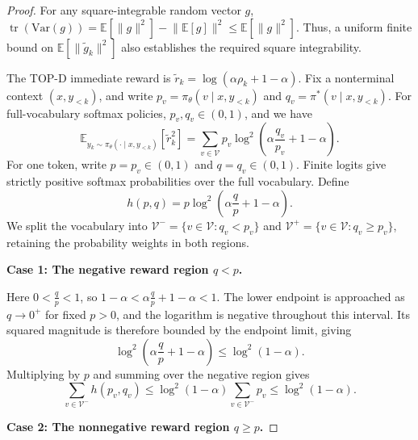 \documentclass{article}
\theoremstyle{plain}
\theoremstyle{definition}
\theoremstyle{remark}
\begin{document}
\begin{proof}
	For any square-integrable random vector $g$, $\operatorname{tr}(\mathrm{Var}(g))=\mathbb{E}[\lVert g\rVert^2]-\lVert\mathbb{E}[g]\rVert^2\leq\mathbb{E}[\lVert g\rVert^2]$. Thus, a uniform finite bound on $\mathbb{E}[\lVert\tilde{g}_k\rVert^2]$ also establishes the required square integrability.
	
	The TOP-D immediate reward is $\tilde{r}_k=\log(\alpha\rho_k+1-\alpha)$. Fix a nonterminal context $(x,y_{<k})$, and write $p_v=\pi_\theta(v\mid x,y_{<k})$ and $q_v=\pi^*(v\mid x,y_{<k})$. For full-vocabulary softmax policies, $p_v,q_v\in(0,1)$, and we have
	\begin{equation}
		\mathbb{E}_{y_k \sim \pi_\theta(\cdot \mid x, y_{<k})}\left[\tilde{r}_k^2\right] = \sum_{v\in\mathcal{V}}p_v\log^2\left(\alpha\frac{q_v}{p_v}+1-\alpha\right).
	\end{equation}
	For one token, write $p=p_v\in(0,1)$ and $q=q_v\in(0,1)$. Finite logits give strictly positive softmax probabilities over the full vocabulary. Define
	\begin{equation}
		h(p, q) = p \log^2\left(\alpha \frac{q}{p} + 1 - \alpha\right).
	\end{equation}
	We split the vocabulary into $\mathcal{V}^-=\{v\in\mathcal{V}:q_v<p_v\}$ and $\mathcal{V}^+=\{v\in\mathcal{V}:q_v\geq p_v\}$, retaining the probability weights in both regions.
	
	\textbf{Case 1: The negative reward region $q < p$.}
	
	Here $0<\frac{q}{p}<1$, so $1-\alpha<\alpha\frac{q}{p}+1-\alpha<1$. The lower endpoint is approached as $q\to0^+$ for fixed $p>0$, and the logarithm is negative throughout this interval. Its squared magnitude is therefore bounded by the endpoint limit, giving
	\begin{equation}
		\log^2\left(\alpha \frac{q}{p} + 1 - \alpha\right) \leq \log^2(1 - \alpha).
	\end{equation}
	Multiplying by $p$ and summing over the negative region gives
	\begin{equation}
		\sum_{v\in\mathcal{V}^-}h(p_v,q_v)\leq\log^2(1-\alpha)\sum_{v\in\mathcal{V}^-}p_v\leq\log^2(1-\alpha).
	\end{equation}
	
	\textbf{Case 2: The nonnegative reward region $q \geq p$.}
	

\end{proof}
\end{document}
